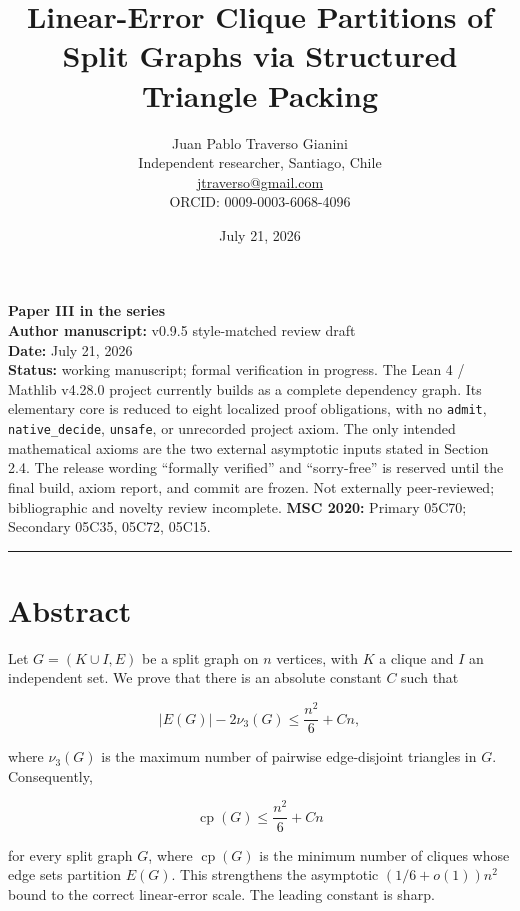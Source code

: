 \documentclass[
  11pt,
]{article}
\title{Linear-Error Clique Partitions of Split Graphs via Structured Triangle Packing}
\author{Juan Pablo Traverso Gianini\\
\small Independent researcher, Santiago, Chile\\
\small \href{mailto:jtraverso@gmail.com}{jtraverso@gmail.com}\\
\small ORCID: 0009-0003-6068-4096}
\date{July 21, 2026}
\begin{document}
\sloppy
\maketitle
\begin{small}\begin{raggedright}

\textbf{Paper III in the series}\\
\textbf{Author manuscript:} v0.9.5 style-matched review draft\\
\textbf{Date:} July 21, 2026\\
\textbf{Status:} working manuscript; formal verification in progress. The Lean 4 / Mathlib v4.28.0 project currently builds as a complete dependency graph. Its elementary core is reduced to eight localized proof obligations, with no \texttt{admit}, \texttt{native\_decide}, \texttt{unsafe}, or unrecorded project axiom. The only intended mathematical axioms are the two external asymptotic inputs stated in Section 2.4. The release wording ``formally verified'' and ``sorry-free'' is reserved until the final build, axiom report, and commit are frozen. Not externally peer-reviewed; bibliographic and novelty review incomplete. \textbf{MSC 2020:} Primary 05C70; Secondary 05C35, 05C72, 05C15.

\begin{center}\rule{0.5\linewidth}{0.5pt}\end{center}

\end{raggedright}\end{small}

\section{Abstract}\label{abstract}

Let \(G=(K\cup I,E)\) be a split graph on \(n\) vertices, with \(K\) a
clique and \(I\) an independent set. We prove that there is an absolute
constant \(C\) such that

\[
|E(G)|-2\nu_3(G)
\le
\frac{n^2}{6}+Cn,
\]

where \(\nu_3(G)\) is the maximum number of pairwise edge-disjoint
triangles in \(G\). Consequently,

\[
\operatorname{cp}(G)
\le
\frac{n^2}{6}+Cn
\]

for every split graph \(G\), where \(\operatorname{cp}(G)\) is the
minimum number of cliques whose edge sets partition \(E(G)\). This
strengthens the asymptotic \((1/6+o(1))n^2\) bound to the correct
linear-error scale. The leading constant is sharp.
\end{document}
